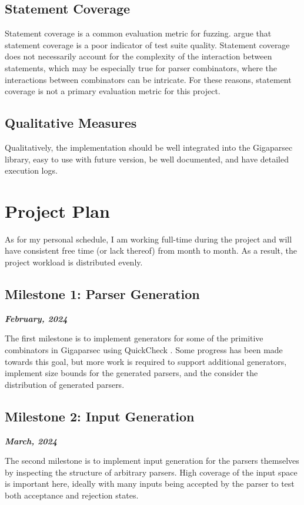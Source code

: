 \documentclass[11pt]{article}
\let\oldciteauthor\citeauthor
\renewcommand{\citeauthor}[1]{\oldciteauthor{#1} \cite{#1}}
\newcommand{\be}[1]{\textbf{\emph{#1}}}
\begin{document}
\subsection{Statement Coverage}

Statement coverage is a common evaluation metric for fuzzing. \citeauthor{coverage} argue that statement coverage is a poor indicator of test suite quality. Statement coverage does not necessarily account for the complexity of the interaction between statements, which may be especially true for parser combinators, where the interactions between combinators can be intricate. For these reasons, statement coverage is not a primary evaluation metric for this project.

\subsection{Qualitative Measures}

Qualitatively, the implementation should be well integrated into the Gigaparsec library, easy to use with future version, be well documented, and have detailed execution logs.

\section{Project Plan} %

As for my personal schedule, I am working full-time during the project and will have consistent free time (or lack thereof) from month to month. As a result, the project workload is distributed evenly.

\subsection{Milestone 1: Parser Generation}
\be{February, 2024}

The first milestone is to implement generators for some of the primitive combinators in Gigaparsec using QuickCheck \cite{quickcheck}. Some progress has been made towards this goal, but more work is required to support additional generators, implement size bounds for the generated parsers, and the consider the distribution of generated parsers.

\subsection{Milestone 2: Input Generation}
\be{March, 2024}

The second milestone is to implement input generation for the parsers themselves by inspecting the structure of arbitrary parsers. High coverage of the input space is important here, ideally with many inputs being accepted by the parser to test both acceptance and rejection states.
\end{document}
